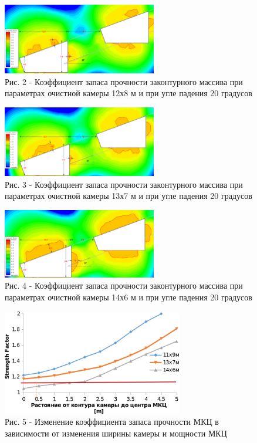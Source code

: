 \begin{figure}[H]
	\centering
	\includegraphics[width=0.6\textwidth]{assets/283}
    \caption*{Рис. 2 - Коэффициент запаса прочности законтурного массива при параметрах очистной камеры 12х8 м и при угле падения 20 градусов}
\end{figure}

\begin{figure}[H]
	\centering
	\includegraphics[width=0.6\textwidth]{assets/284}
    \caption*{Рис. 3 - Коэффициент запаса прочности законтурного массива при параметрах очистной камеры 13х7 м и при угле падения 20 градусов}
\end{figure}

\begin{figure}[H]
	\centering
	\includegraphics[width=0.6\textwidth]{assets/285}
    \caption*{Рис. 4 - Коэффициент запаса прочности законтурного массива при параметрах очистной камеры 14х6 м и при угле падения 20 градусов}
\end{figure}

\begin{figure}[H]
	\centering
	\includegraphics[width=0.7\textwidth]{assets/285.1}
    \caption*{Рис. 5 - Изменение коэффициента запаса прочности МКЦ в зависимости от изменения ширины камеры и мощности МКЦ}
\end{figure}

